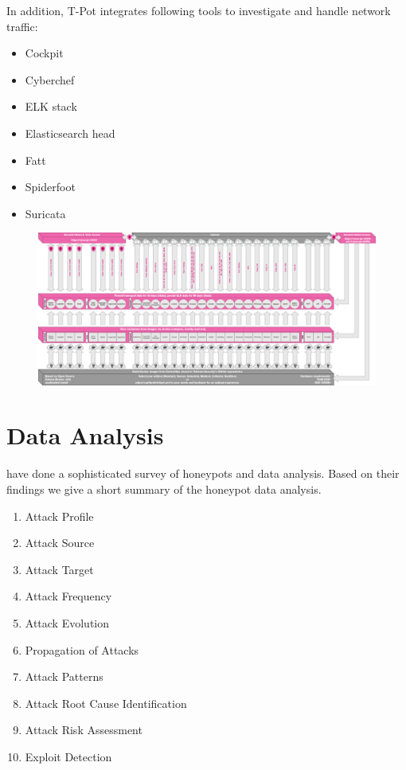 In addition, T-Pot integrates following tools to investigate and handle network traffic:

\begin{itemize}
    \item Cockpit
    \item Cyberchef
    \item ELK stack
    \item Elasticsearch head
    \item Fatt
    \item Spiderfoot
    \item Suricata
\end{itemize}

\begin{figure}
    \centering
    \includegraphics[width=\textwidth]{figures/architecture.png}
    \caption{}
    \label{fig:overview-tpot}
\end{figure}

\section{Data Analysis}

\citet{NawrockiWSKS2016} have done a sophisticated survey of honeypots and data analysis.
Based on their findings we give a short summary of the honeypot data analysis.

\begin{enumerate}
    \item Attack Profile
    \item Attack Source
    \item Attack Target
    \item Attack Frequency
    \item Attack Evolution
    \item Propagation of Attacks
    \item Attack Patterns
    \item Attack Root Cause Identification
    \item Attack Risk Assessment
    \item Exploit Detection
\end{enumerate}


